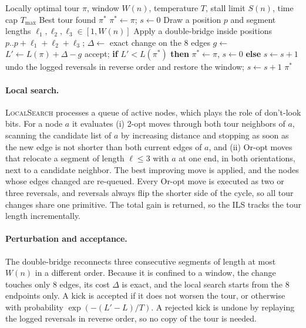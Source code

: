 \documentclass[runningheads]{llncs}
\begin{document}
\begin{algorithm}
\caption{\textsc{Polish} --- localized ILS with stagnation stopping}
\label{alg:polish}
\begin{algorithmic}[1]
\Require Locally optimal tour $\pi$, window $W(n)$, temperature $T$,
         stall limit $S(n)$, time cap $T_{\max}$
\Ensure Best tour found $\pi^*$
\State $\pi^*\gets\pi$; $s\gets 0$
  \State Draw a position $p$ and segment lengths $\ell_1,\ell_2,\ell_3\in[1,W(n)]$
  \State Apply a double-bridge inside positions $p..p{+}\ell_1{+}\ell_2{+}\ell_3$;
         $\Delta\gets$ exact change on the 8 edges
  \State $g\gets$ 
  \State $L'\gets L(\pi)+\Delta-g$
    \State accept; \textbf{if} $L'<L(\pi^*)$ \textbf{then} $\pi^*\gets\pi$, $s\gets 0$
           \textbf{else} $s\gets s+1$
  \Else
    \State undo the logged reversals in reverse order and restore the window;
           $s\gets s+1$
  \EndIf
\EndWhile
\State \Return $\pi^*$
\end{algorithmic}
\end{algorithm}

\paragraph{Local search.}
\textsc{LocalSearch} processes a queue of active nodes, which plays the
role of don't-look bits. For a node $a$ it evaluates (i) 2-opt moves
through both tour neighbors of $a$, scanning the candidate list of $a$
by increasing distance and stopping as soon as the new edge is not
shorter than both current edges of $a$, and (ii) Or-opt moves that
relocate a segment of length $\ell\le 3$ with $a$ at one end, in both
orientations, next to a candidate neighbor. The best improving move is
applied, and the nodes whose edges changed are re-queued. Every Or-opt
move is executed as two or three reversals, and reversals always flip
the shorter side of the cycle, so all tour changes share one primitive.
The total gain is returned, so the ILS tracks the tour length
incrementally.

\paragraph{Perturbation and acceptance.}
The double-bridge reconnects three consecutive segments of length at
most $W(n)$ in a different order. Because it is confined to a window,
the change touches only 8 edges, its cost $\Delta$ is exact, and the
local search starts from the 8 endpoints only. A kick is accepted if it
does not worsen the tour, or otherwise with probability
$\exp(-(L'-L)/T)$. A rejected kick is undone by replaying the logged
reversals in reverse order, so no copy of the tour is needed.
\end{document}
